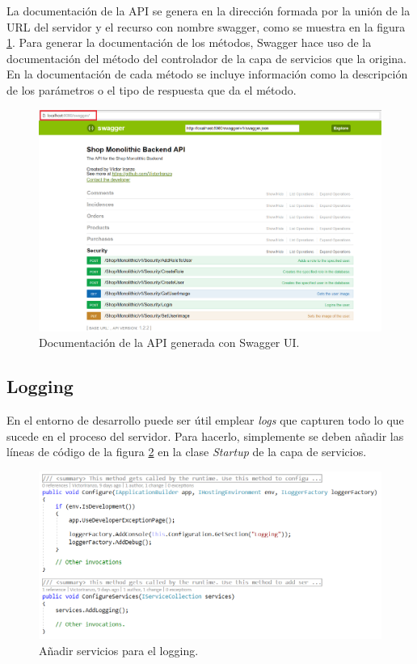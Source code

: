 \documentclass[11pt,spanish,listoffigures]{tfgetsinf}
\begin{document}
La documentación de la API se genera en la dirección formada por la unión de la URL del servidor y el recurso con nombre swagger, como se muestra en la figura \ref{fig:SwaggerAPI}. Para generar la documentación de los métodos, Swagger hace uso de la documentación del método del controlador de la capa de servicios que la origina. En la documentación de cada método se incluye información como la descripción de los parámetros o el tipo de respuesta que da el método.

\begin{figure}[h]
\centering
\includegraphics[scale=0.4]{SwaggerAPI}
\caption{Documentación de la API generada con Swagger UI.}
\label{fig:SwaggerAPI}
\end{figure}

\subsection{Logging}
En el entorno de desarrollo puede ser útil emplear \textit{logs} que capturen todo lo que sucede en el proceso del servidor. Para hacerlo, simplemente se deben añadir las líneas de código de la figura \ref{fig:loggingDev} en la clase \textit{Startup} de la capa de servicios.

\begin{figure}[h]
\centering
\includegraphics[scale=0.7]{loggingDev}
\caption{Añadir servicios para el logging.}
\label{fig:loggingDev}
\end{figure}
\end{document}
